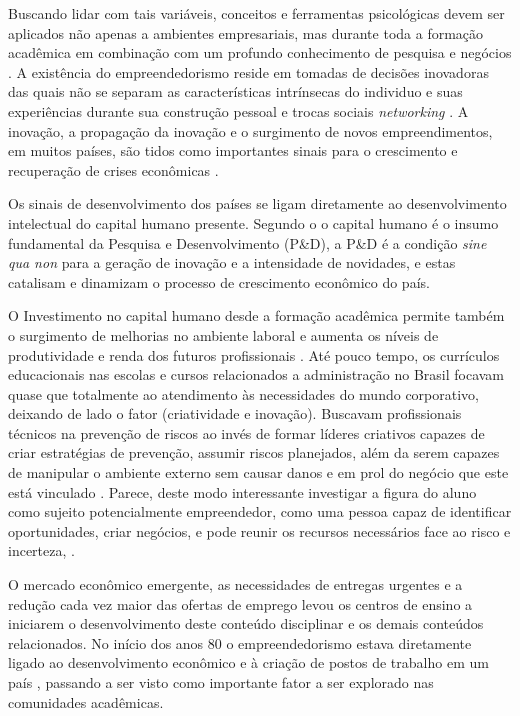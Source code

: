 Buscando lidar com tais variáveis, conceitos e ferramentas psicológicas devem ser aplicados não apenas a ambientes empresariais, mas durante toda a formação acadêmica em combinação com um profundo conhecimento de pesquisa e negócios \cite{zhao_relationship_2010}. A existência do empreendedorismo reside em tomadas de decisões inovadoras das quais não se separam as características intrínsecas do individuo e suas experiências durante sua construção pessoal e trocas sociais \textit{networking} \cite{alencar_intencao_2019}. A inovação, a propagação da inovação e o surgimento de novos empreendimentos, em muitos países, são tidos como importantes sinais para o crescimento e recuperação de crises econômicas \cite{silva_mudancestrutural_2017}. 

Os sinais de desenvolvimento dos países se ligam diretamente ao desenvolvimento intelectual do capital humano presente. Segundo o  o capital humano é o insumo fundamental da Pesquisa e Desenvolvimento (P\&D), a P\&D é a condição \textit{sine qua non} para a geração de inovação e a intensidade de novidades, e estas catalisam e dinamizam o processo de crescimento econômico do país.


O Investimento no capital humano desde a formação acadêmica permite também o surgimento de melhorias no ambiente laboral e aumenta os níveis de produtividade e renda dos futuros profissionais \cite{macedo_capital_2019}. Até pouco tempo, os currículos educacionais nas escolas e cursos relacionados a administração no Brasil focavam quase que totalmente ao atendimento às necessidades do mundo corporativo, deixando de lado o fator (criatividade e inovação). Buscavam profissionais técnicos na prevenção de riscos ao invés de formar líderes criativos capazes de criar estratégias de prevenção, assumir riscos planejados, além da serem capazes de manipular o ambiente externo sem causar danos e em prol do negócio que este está vinculado \cite{palmer_chip_2019}. Parece, deste modo interessante investigar a figura do aluno como sujeito potencialmente empreendedor, como uma pessoa capaz de identificar oportunidades, criar negócios, e pode reunir os recursos necessários face ao risco e incerteza, \cite{pietrovski_alise_2019}.

O mercado econômico emergente, as necessidades de entregas urgentes e a redução cada vez maior das ofertas de emprego levou os centros de ensino a iniciarem o desenvolvimento deste conteúdo disciplinar e os demais conteúdos relacionados. No início dos anos 80 o empreendedorismo estava diretamente ligado ao desenvolvimento econômico e à criação de postos de trabalho em um país \cite{rodrigues_intencao_2019}, passando a ser visto como importante fator a ser explorado nas comunidades acadêmicas. 

